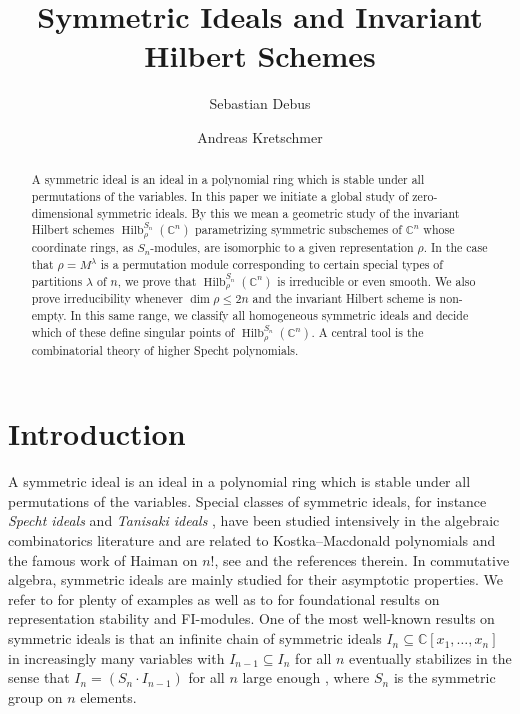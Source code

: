 \documentclass[11pt]{amsart}
\theoremstyle{definition}
\newcommand{\CC}{\mathbb{C}}
\DeclareMathOperator{\Hilb}{Hilb}
\begin{document}
\nocite*{}
\title[]
{
Symmetric Ideals and Invariant Hilbert Schemes
}

\author{Sebastian Debus}
\author{Andreas Kretschmer}

\begin{abstract}
A symmetric ideal is an ideal in a polynomial ring which is stable under all permutations of the variables. In this paper we initiate a global study of zero-dimensional symmetric ideals. By this we mean a geometric study of the invariant Hilbert schemes $\Hilb_{\rho}^{S_n}(\CC^n)$ parametrizing symmetric subschemes of $\CC^n$ whose coordinate rings, as $S_n$-modules, are isomorphic to a given representation $\rho$. In the case that $\rho = M^\lambda$ is a permutation module corresponding to certain special types of partitions $\lambda$ of $n$, we prove that $\Hilb_{\rho}^{S_n}(\CC^n)$ is irreducible or even smooth. We also prove irreducibility whenever $\dim \rho \leq 2n$ and the invariant Hilbert scheme is non-empty. In this same range, we classify all homogeneous symmetric ideals and decide which of these define singular points of $\Hilb_{\rho}^{S_n}(\CC^n)$. A central tool is the combinatorial theory of higher Specht polynomials. 
\end{abstract}

\maketitle


\section{Introduction}

A symmetric ideal is an ideal in a polynomial ring which is stable under all permutations of the variables.
Special classes of symmetric ideals, for instance \emph{Specht ideals} and \emph{Tanisaki ideals} \cite{Tanisaki1982Defining,BergeronGarsia1992Harmonic,GarsiaProcesi1992}, have been studied intensively in the algebraic combinatorics literature and are related to Kostka--Macdonald polynomials and the famous work of Haiman on $n!$, see \cite{Haiman2003Combinatorics} and the references therein.
In commutative algebra, symmetric ideals are mainly studied for their asymptotic properties. We refer to \cite{Nagel2017Equivariant,Nagel2019FIvaryingCoeff,NagelRoemer2020CodimUpToSymmetry,NagelRoemer2021RegularityUpToSymmetry,nagpal2021symmetric} for plenty of examples as well as to \cite{ChurchFarb2013RepresentationStability,ChurchEllenbergFarb2015FImodules} for foundational results on representation stability and FI-modules. One of the most well-known results on symmetric ideals is that an infinite chain of symmetric ideals $I_n \subseteq \CC[x_1,\ldots,x_n]$ in increasingly many variables with $I_{n-1} \subseteq I_n$ for all $n$ eventually stabilizes in the sense that $I_n = (S_n \cdot I_{n-1})$ for all $n$ large enough \cite{Cohen1967Laws,Aschenbrenner2007Finite,Hillar2012Finite,Draisma2014Noetherianity}, where $S_n$ is the symmetric group on $n$ elements.
\end{document}

